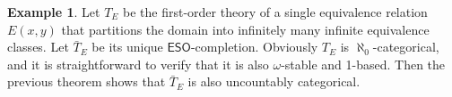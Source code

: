 \documentclass[a4paper]{amsart}
\theoremstyle{definition}
\newtheorem{example}[definition]{Example}
\theoremstyle{remark}
\newcommand\eso{\mathsf{ESO}}
\theoremstyle{definition}
\begin{document}
\begin{example}
    Let $T_E$ be the first-order theory of a single equivalence relation $E(x,y)$ that partitions the domain into infinitely many infinite equivalence classes. Let $\bar T_E$ be its unique $\eso$-completion. Obviously $T_E$ is $\aleph_0$-categorical, and it is straightforward to verify that it is also $\omega$-stable and 1-based. Then the previous theorem shows that $\bar T_E$ is also uncountably categorical.
\end{example}


\printbibliography
\end{document}
